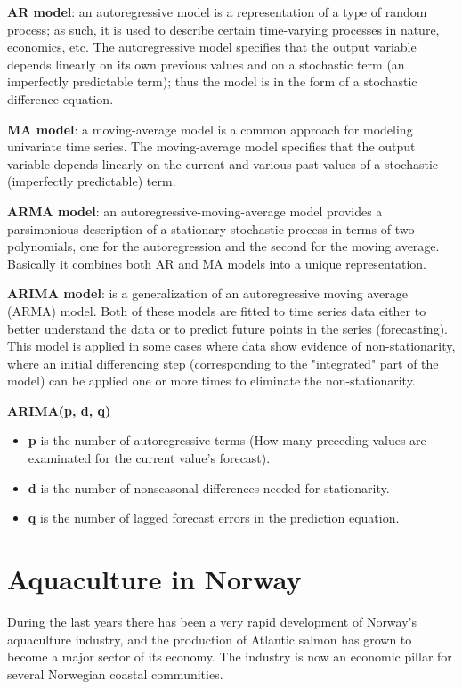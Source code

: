 \textbf{AR model}: an autoregressive model is a representation of a type of random process; as such, it is used to describe certain time-varying processes in nature, economics, etc. The autoregressive model specifies that the output variable depends linearly on its own previous values and on a stochastic term (an imperfectly predictable term); thus the model is in the form of a stochastic difference equation.\cite{wiki:AR}

\textbf{MA model}: a moving-average model is a common approach for modeling univariate time series. The moving-average model specifies that the output variable depends linearly on the current and various past values of a stochastic (imperfectly predictable) term.\cite{wiki:MA}

\newpage

\textbf{ARMA model}: an autoregressive-moving-average model provides a parsimonious description of a stationary stochastic process in terms of two polynomials, one for the autoregression and the second for the moving average. Basically it combines both AR and MA models into a unique representation.\cite{wiki:ARMA}

\textbf{ARIMA model}: is a generalization of an autoregressive moving average (ARMA) model. Both of these models are fitted to time series data either to better understand the data or to predict future points in the series (forecasting).\\
This model is applied in some cases where data show evidence of non-stationarity, where an initial differencing step (corresponding to the "integrated" part of the model) can be applied one or more times to eliminate the non-stationarity.\cite{wiki:ARIMA}

\textbf{ARIMA(p, d, q)}
  \vspace{-5mm}
\begin{itemize}
 \setlength{\itemsep}{-5pt}
\item \textbf{p} is the number of autoregressive terms (How many preceding values are examinated for the current value’s forecast).

\item \textbf{d} is the number of nonseasonal differences needed for stationarity.

\item \textbf{q} is the number of lagged forecast errors in the prediction equation. 
\end{itemize}

\newpage

\section{Aquaculture in Norway}
\vspace{-5mm}
During the last years there has been a very rapid development of Norway's aquaculture industry, and the production of Atlantic salmon has grown to become a major sector of its economy. The industry is now an economic pillar for several Norwegian coastal communities.\cite{SenCanada}

